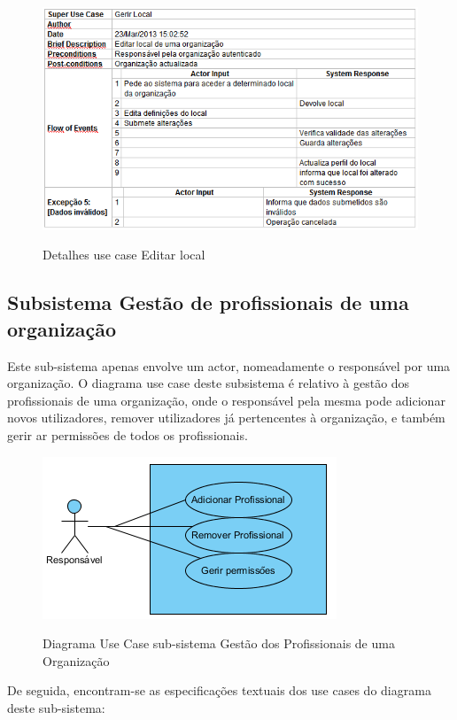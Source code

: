 ﻿\documentclass[12pt,a4paper]{article}
\begin{document}
\begin{figure}[h!]
\centering
\includegraphics[scale=0.7]{d_usecase/editarlocal}
\label{usecase}
\caption{Detalhes use case Editar local}
\end{figure}

\subsection{Subsistema Gestão de profissionais de uma organização}
Este sub-sistema apenas envolve um actor, nomeadamente o responsável por uma organização. O diagrama
use case deste subsistema é relativo à gestão dos profissionais de uma organização, onde o responsável pela mesma pode adicionar novos utilizadores, remover utilizadores já pertencentes à organização, e também gerir ar permissões de todos os profissionais.\\

\begin{figure}[h!]
\centering
\includegraphics[scale=1]{usecase/R_GerirProfissionais}
\label{usecase}
\caption{Diagrama Use Case sub-sistema Gestão dos Profissionais de uma Organização}
\end{figure}

De seguida, encontram-se as especificações textuais dos use cases do diagrama deste sub-sistema:\\
\end{document}
